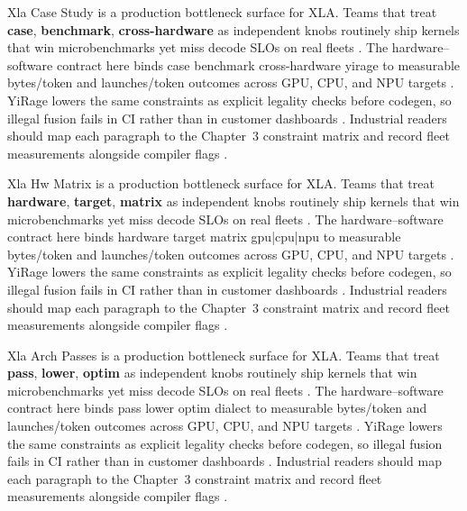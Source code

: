 Xla Case Study is a production bottleneck surface for XLA. Teams that treat \textbf{case}, \textbf{benchmark}, \textbf{cross-hardware} as independent knobs routinely ship kernels that win microbenchmarks yet miss decode SLOs on real fleets \citep{taxbreak2026,semianalysis2024tma}. The hardware--software contract here binds case benchmark cross-hardware yirage to measurable bytes/token and launches/token outcomes across GPU, CPU, and NPU targets \citep{memoryfloor2026,amd2024xdna}. YiRage lowers the same constraints as explicit legality checks before codegen, so illegal fusion fails in CI rather than in customer dashboards \citep{nvidia2022hopper,amd2024aie}. Industrial readers should map each paragraph to the Chapter~3 constraint matrix and record fleet measurements alongside compiler flags \citep{semianalysis2024tma,dlbook}.

Xla Hw Matrix is a production bottleneck surface for XLA. Teams that treat \textbf{hardware}, \textbf{target}, \textbf{matrix} as independent knobs routinely ship kernels that win microbenchmarks yet miss decode SLOs on real fleets \citep{memoryfloor2026,amd2024xdna}. The hardware--software contract here binds hardware target matrix gpu|cpu|npu to measurable bytes/token and launches/token outcomes across GPU, CPU, and NPU targets \citep{nvidia2022hopper,amd2024aie}. YiRage lowers the same constraints as explicit legality checks before codegen, so illegal fusion fails in CI rather than in customer dashboards \citep{semianalysis2024tma,dlbook}. Industrial readers should map each paragraph to the Chapter~3 constraint matrix and record fleet measurements alongside compiler flags \citep{amd2024xdna,dao2022flashattention}.

Xla Arch Passes is a production bottleneck surface for XLA. Teams that treat \textbf{pass}, \textbf{lower}, \textbf{optim} as independent knobs routinely ship kernels that win microbenchmarks yet miss decode SLOs on real fleets \citep{nvidia2022hopper,amd2024aie}. The hardware--software contract here binds pass lower optim dialect to measurable bytes/token and launches/token outcomes across GPU, CPU, and NPU targets \citep{semianalysis2024tma,dlbook}. YiRage lowers the same constraints as explicit legality checks before codegen, so illegal fusion fails in CI rather than in customer dashboards \citep{amd2024xdna,dao2022flashattention}. Industrial readers should map each paragraph to the Chapter~3 constraint matrix and record fleet measurements alongside compiler flags \citep{amd2024aie,kwon2023vllm}.

